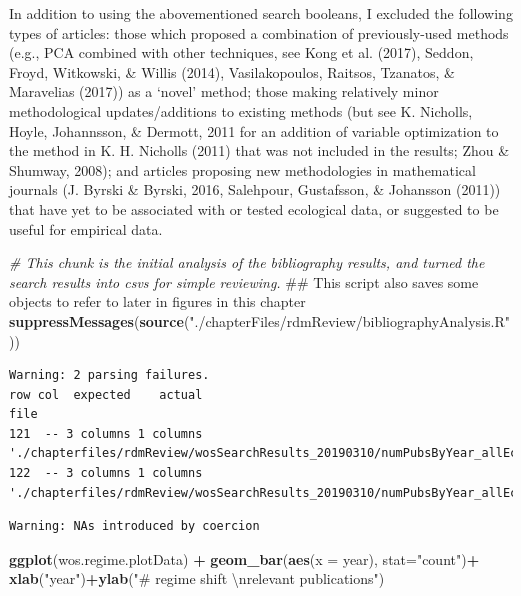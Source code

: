 \documentclass[12pt,twoside,openany]{reedthesis}
\newenvironment{Shaded}{\begin{snugshade}}{\end{snugshade}}
\newcommand{\KeywordTok}[1]{\textcolor[rgb]{0.13,0.29,0.53}{\textbf{#1}}}
\newcommand{\DataTypeTok}[1]{\textcolor[rgb]{0.13,0.29,0.53}{#1}}
\newcommand{\CharTok}[1]{\textcolor[rgb]{0.31,0.60,0.02}{#1}}
\newcommand{\StringTok}[1]{\textcolor[rgb]{0.31,0.60,0.02}{#1}}
\newcommand{\CommentTok}[1]{\textcolor[rgb]{0.56,0.35,0.01}{\textit{#1}}}
\newcommand{\OperatorTok}[1]{\textcolor[rgb]{0.81,0.36,0.00}{\textbf{#1}}}
\newcommand{\NormalTok}[1]{#1}
\begin{document}
In addition to using the abovementioned search booleans, I excluded the
following types of articles: those which proposed a combination of
previously-used methods (e.g., PCA combined with other techniques, see
Kong et al. (2017), Seddon, Froyd, Witkowski, \& Willis (2014),
Vasilakopoulos, Raitsos, Tzanatos, \& Maravelias (2017)) as a `novel'
method; those making relatively minor methodological updates/additions
to existing methods (but see K. Nicholls, Hoyle, Johannsson, \& Dermott,
2011 for an addition of variable optimization to the method in K. H.
Nicholls (2011) that was not included in the results; Zhou \& Shumway,
2008); and articles proposing new methodologies in mathematical journals
(J. Byrski \& Byrski, 2016, Salehpour, Gustafsson, \& Johansson (2011))
that have yet to be associated with or tested ecological data, or
suggested to be useful for empirical data.
\begin{Shaded}
\begin{Highlighting}[]
\CommentTok{# This chunk is the initial analysis of the bibliography results, and turned the search results into csvs for simple reviewing. }
\NormalTok{## This script also saves some objects to refer to later in figures in this chapter}
\KeywordTok{suppressMessages}\NormalTok{(}\KeywordTok{source}\NormalTok{(}\StringTok{"./chapterFiles/rdmReview/bibliographyAnalysis.R"}\NormalTok{))}
\end{Highlighting}
\end{Shaded}
\begin{verbatim}
Warning: 2 parsing failures.
row col  expected    actual                                                                              file
121  -- 3 columns 1 columns './chapterfiles/rdmReview/wosSearchResults_20190310/numPubsByYear_allEcology.txt'
122  -- 3 columns 1 columns './chapterfiles/rdmReview/wosSearchResults_20190310/numPubsByYear_allEcology.txt'
\end{verbatim}
\begin{verbatim}
Warning: NAs introduced by coercion
\end{verbatim}
\begin{Shaded}
\begin{Highlighting}[]
\KeywordTok{ggplot}\NormalTok{(wos.regime.plotData) }\OperatorTok{+}
\StringTok{  }\KeywordTok{geom_bar}\NormalTok{(}\KeywordTok{aes}\NormalTok{(}\DataTypeTok{x =}\NormalTok{ year), }\DataTypeTok{stat=}\StringTok{"count"}\NormalTok{)}\OperatorTok{+}
\StringTok{  }\KeywordTok{xlab}\NormalTok{(}\StringTok{"year"}\NormalTok{)}\OperatorTok{+}\KeywordTok{ylab}\NormalTok{(}\StringTok{"# regime shift }\CharTok{\textbackslash{}n}\StringTok{relevant publications"}\NormalTok{)}
\end{Highlighting}
\end{Shaded}
\end{document}
